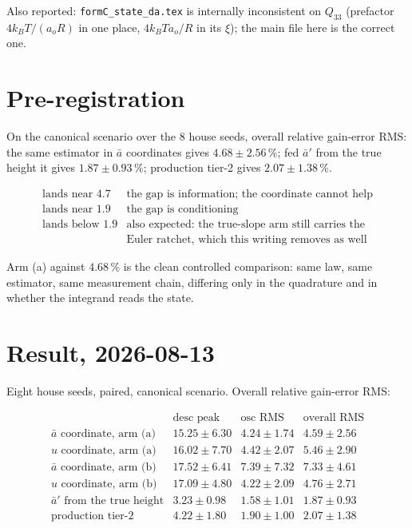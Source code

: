 \documentclass[11pt,a4paper,fontset=none]{ctexart}
\newcommand{\ba}{\bar{a}}
\begin{document}
Also reported: \texttt{formC\_state\_da.tex} is internally inconsistent on
$Q_{33}$ (prefactor $4k_BT/(a_oR)$ in one place, $4k_BT a_o/R$ in its $\xi$);
the main file here is the correct one.

\section*{Pre-registration}

On the canonical scenario over the 8 house seeds, overall relative gain-error
RMS: the same estimator in $\ba$ coordinates gives $4.68 \pm 2.56\,\%$; fed
$\ba'$ from the true height it gives $1.87 \pm 0.93\,\%$; production tier-2
gives $2.07 \pm 1.38\,\%$.

\begin{equation*}
\begin{array}{ll}
\text{lands near } 4.7 & \text{the gap is information; the coordinate cannot help} \\
\text{lands near } 1.9 & \text{the gap is conditioning} \\
\text{lands below } 1.9 & \text{also expected: the true-slope arm still carries the}\\
 & \text{Euler ratchet, which this writing removes as well}
\end{array}
\end{equation*}

Arm (a) against $4.68\,\%$ is the clean controlled comparison: same law, same
estimator, same measurement chain, differing only in the quadrature and in
whether the integrand reads the state.


\section*{Result, 2026-08-13}

Eight house seeds, paired, canonical scenario. Overall relative gain-error RMS:

\begin{equation*}
\begin{array}{lccc}
 & \text{desc peak} & \text{osc RMS} & \text{overall RMS} \\[0.2em]
\ba \text{ coordinate, arm (a)}      & 15.25\pm6.30 & 4.24\pm1.74 & 4.59\pm2.56 \\
u \text{ coordinate, arm (a)}        & 16.02\pm7.70 & 4.42\pm2.07 & 5.46\pm2.90 \\
\ba \text{ coordinate, arm (b)}      & 17.52\pm6.41 & 7.39\pm7.32 & 7.33\pm4.61 \\
u \text{ coordinate, arm (b)}        & 17.09\pm4.80 & 4.22\pm2.09 & 4.76\pm2.71 \\
\ba' \text{ from the true height}    & 3.23\pm0.98  & 1.58\pm1.01 & 1.87\pm0.93 \\
\text{production tier-2}             & 4.22\pm1.80  & 1.90\pm1.00 & 2.07\pm1.38
\end{array}
\end{equation*}
\end{document}
